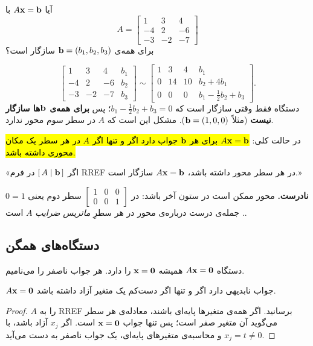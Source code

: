 \begin{example}
آیا $A\mathbf{x}=\mathbf{b}$ با 
\[
A=\begin{bmatrix}1&3&4\\-4&2&-6\\-3&-2&-7\end{bmatrix}
\]
برای همه‌ی $\mathbf{b}=(b_1,b_2,b_3)$ سازگار است؟
\end{example}
\begin{solution}
\[
\left[\begin{array}{ccc|c}1&3&4&b_1\\-4&2&-6&b_2\\-3&-2&-7&b_3\end{array}\right]
\sim
\left[\begin{array}{ccc|c}1&3&4&b_1\\0&14&10&b_2+4b_1\\0&0&0&b_1-\frac12b_2+b_3\end{array}\right].
\]
دستگاه فقط وقتی سازگار است که $b_1-\frac12b_2+b_3=0$؛ پس \textbf{برای همه‌ی $\mathbf{b}$ها سازگار نیست} (مثلاً $\mathbf{b}=(1,0,0)$). مشکل این است که $A$ در سطر سوم محور ندارد.
\end{solution}

\begin{note}
در حالت کلی: \hl{$A\mathbf{x}=\mathbf{b}$ برای هر $\mathbf{b}$ جواب دارد اگر و تنها اگر $A$ در هر سطر یک مکان محوری داشته باشد.}
\end{note}

\begin{example}
«اگر $\left[\,A\;\middle|\;\mathbf{b}\,\right]$ در فرم RREF در هر سطر محور داشته باشد، $A\mathbf{x}=\mathbf{b}$ سازگار است.»
\end{example}
\begin{solution}
\textbf{نادرست.} محور ممکن است در ستون آخر باشد: در $\left[\begin{array}{cc|c}1&0&0\\0&0&1\end{array}\right]$ سطر دوم یعنی $0=1$. جمله‌ی درست درباره‌ی محور در هر سطرِ \emph{ماتریس ضرایب } $A$ است.
\end{solution}

\subsection{دستگاه‌های همگن}
دستگاه $A\mathbf{x}=\mathbf{0}$ همیشه  $\mathbf{x}=\mathbf{0}$ را دارد. هر جواب ناصفر را  می‌نامیم.

\begin{theorem}\label{thm:homog-free}
$A\mathbf{x}=\mathbf{0}$ جواب نابدیهی دارد اگر و تنها اگر دست‌کم یک متغیر آزاد داشته باشد.
\end{theorem}
\begin{proof}
$A$ را به RREF برسانید. اگر همه‌ی متغیرها پایه‌ای باشند، معادله‌ی هر سطر می‌گوید آن متغیر صفر است؛ پس تنها جواب $\mathbf{x}=\mathbf{0}$ است. اگر $x_j$ آزاد باشد، با $x_j=t\neq0$ و محاسبه‌ی متغیرهای پایه‌ای، یک جواب ناصفر به دست می‌آید.
\end{proof}

